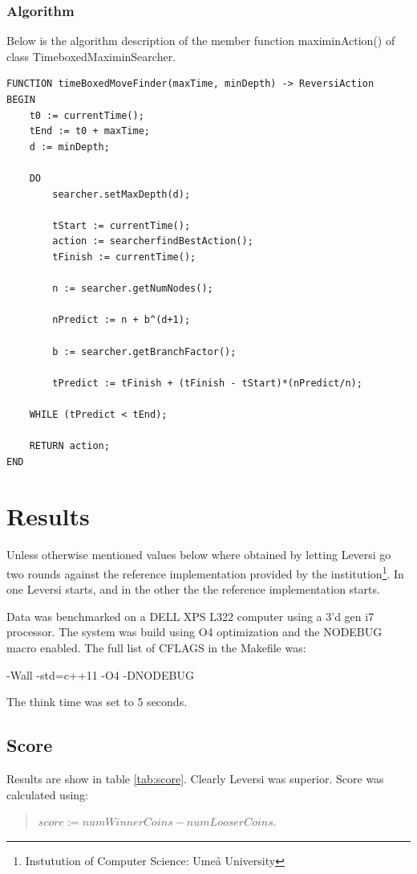 \documentclass[a4paper,11pt]{article}
\begin{document}
\subsubsection{Algorithm}
Below is the algorithm description of the member function maximinAction() of class TimeboxedMaximinSearcher.

\begin{lstlisting}
FUNCTION timeBoxedMoveFinder(maxTime, minDepth) -> ReversiAction
BEGIN
	t0 := currentTime();
	tEnd := t0 + maxTime;
	d := minDepth;
	
	DO
		searcher.setMaxDepth(d);
		
		tStart := currentTime();
		action := searcherfindBestAction();
		tFinish := currentTime();
		
		n := searcher.getNumNodes();
		
		nPredict := n + b^(d+1);
		
		b := searcher.getBranchFactor();
		
		tPredict := tFinish + (tFinish - tStart)*(nPredict/n);
		
	WHILE (tPredict < tEnd);
	
	RETURN action;
END
\end{lstlisting}

\section{Results}
Unless otherwise mentioned values below where obtained by letting Leversi go two rounds against the reference implementation provided by the institution\footnote{Instutution of Computer Science: Umeå University}. In one Leversi starts, and in the other the the reference implementation starts.

Data was benchmarked on a DELL XPS L322 computer using a 3'd gen i7 processor. The system was build using O4 optimization and the NODEBUG macro enabled. The full list of CFLAGS in the Makefile was:

-Wall -std=c++11 -O4 -DNODEBUG

The think time was set to 5 seconds.

\subsection{Score}
Results are show in table \ref{tab:score}. Clearly Leversi was superior. Score was calculated using:
\begin{quotation}
$score :=  numWinnerCoins - numLooserCoins$.
\end{quotation}
\end{document}
